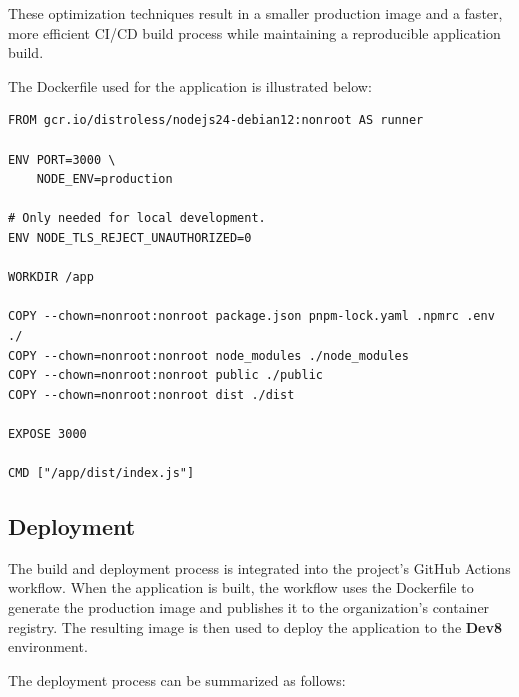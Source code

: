 These optimization techniques result in a smaller production image and a faster, more efficient CI/CD build process while maintaining a reproducible application build.

The Dockerfile used for the application is illustrated below:

\begin{lstlisting}[language=Docker, caption={Dockerfile for the production image}, label={lst:gcs-proxy-dockerfile}]
FROM gcr.io/distroless/nodejs24-debian12:nonroot AS runner

ENV PORT=3000 \
    NODE_ENV=production

# Only needed for local development.
ENV NODE_TLS_REJECT_UNAUTHORIZED=0

WORKDIR /app

COPY --chown=nonroot:nonroot package.json pnpm-lock.yaml .npmrc .env ./
COPY --chown=nonroot:nonroot node_modules ./node_modules
COPY --chown=nonroot:nonroot public ./public
COPY --chown=nonroot:nonroot dist ./dist

EXPOSE 3000

CMD ["/app/dist/index.js"]
\end{lstlisting}

\subsection{Deployment}

The build and deployment process is integrated into the project's GitHub Actions workflow. When the application is built, the workflow uses the Dockerfile to generate the production image and publishes it to the organization's container registry. The resulting image is then used to deploy the application to the \textbf{Dev8} environment.

The deployment process can be summarized as follows:

